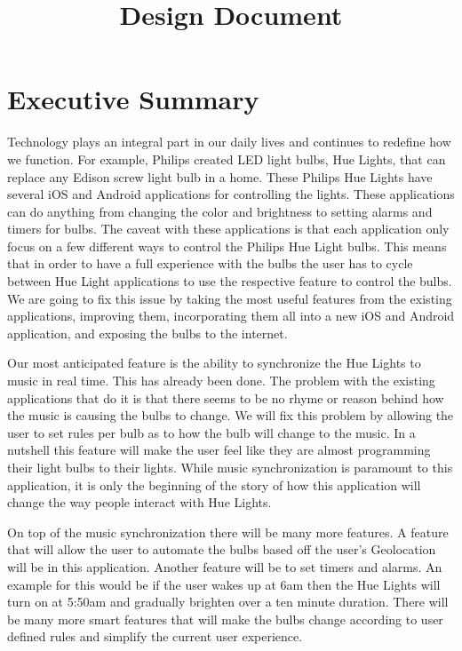 \documentclass[12pt]{article}
\begin{document}
\title{Design Document}
\setlength{\voffset}{0cm}
\setlength{\hoffset}{0cm}

\setlength{\voffset}{-2.54cm}
\setlength{\hoffset}{-2.54cm}
\tableofcontents
\clearpage
{}


\renewcommand{\thefigure}{\arabic{section}.\arabic{figure}}

\section{Executive Summary}
Technology plays an integral part in our daily lives and continues to redefine how we function.  For example, Philips created LED light bulbs, Hue Lights, that can replace any Edison screw light bulb in a home.  These Philips Hue Lights have several iOS and Android applications for controlling the lights. These applications can do anything from changing the color and brightness to setting alarms and timers for bulbs. The caveat with these applications is that each application only focus on a few different ways to control the Philips Hue Light bulbs.  This means that in order to have a full experience with the bulbs the user has to cycle between Hue Light applications to use the respective feature to control the bulbs. We are going to fix this issue by taking the most useful features from the existing applications, improving them, incorporating them all into a new iOS and Android application, and exposing the bulbs to the internet. 

Our most anticipated feature is the ability to synchronize the Hue Lights to music in real time.  This has already been done. The problem with the existing applications that do it is that there seems to be no rhyme or reason behind how the music is causing the bulbs to change.  We will fix this problem by allowing the user to set rules per bulb as to how the bulb will change to the music.  In a nutshell this feature will make the user feel like they are almost programming their light bulbs to their lights. While music synchronization is paramount to this application, it is only the beginning of the story of how this application will change the way people interact with Hue Lights.

On top of the music synchronization there will be many more features.  A feature that will allow the user to automate the bulbs based off the user's Geolocation will be in this application.  Another feature will be to set timers and alarms.  An example for this would be if the user wakes up at 6am then the Hue Lights will turn on at 5:50am and gradually brighten over a ten minute duration.  There will be many more smart features that will make the bulbs change according to user defined rules and simplify the current user experience. 
\end{document}
